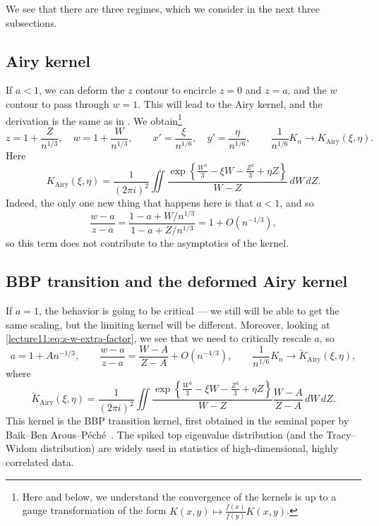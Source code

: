 \documentclass[letterpaper,11pt,oneside,reqno]{book}
\numberwithin{equation}{chapter}  %
\theoremstyle{definition}
\begin{document}
We see that there are three regimes, which we consider in the next three subsections.
\subsection{Airy kernel}
	If $a<1$, we can deform the $z$ contour to encircle $z=0$ and $z=a$,
		and the $w$ contour to pass through $w=1$. This will lead to the Airy kernel,
		and the derivation is the same as in
		.
		We obtain\footnote{Here and below, we understand the convergence
			of the kernels is up to a gauge transformation of the form
		$K(x,y)\mapsto\frac{f(x)}{f(y)}K(x,y)$.}
		\begin{equation*}
			z=1+\frac{Z}{n^{1/3}},\quad w=1+\frac{W}{n^{1/3}},\qquad
			x'=\frac{\xi}{n^{1/6}}, \quad y'=\frac{\eta}{n^{1/6}},
			\qquad
			\frac{1}{n^{1/6}}K_n\to K_{\mathrm{Airy}}(\xi,\eta).
		\end{equation*}
		Here
		\[
			K_{\mathrm{Airy}}(\xi,\eta)=
			\frac{1}{(2\pi i)^2}\iint \frac{\exp\left\{ \frac{W^3}{3}-\xi W-\frac{Z^3}{3}+\eta Z \right\}}{W-Z}\,dW\,dZ.
		\]
		Indeed, the only one new thing that happens here is that $a<1$, and so
		\begin{equation}
			\label{lecture11:eq:z-w-extra-factor}
			\frac{w-a}{z-a}=\frac{1-a+W/n^{1/3}}{1-a+Z/n^{1/3}}=1+O(n^{-1/3}),
		\end{equation}
		so this term does not contribute to the asymptotics of the kernel.

\subsection{BBP transition and the deformed Airy kernel}

		If $a=1$, the behavior is going to be critical --- we still will
		be able to get the same scaling, but the limiting kernel will be different.
		Moreover, looking at \eqref{lecture11:eq:z-w-extra-factor}, we see that
		we need to critically rescale $a$, so
		\begin{equation*}
			a=1+A n^{-1/3},
			\qquad
			\frac{w-a}{z-a}=\frac{W-A}{Z-A}+O(n^{-4/3}),
			\qquad
			\frac{1}{n^{1/6}}K_n\to \tilde K_{\mathrm{Airy}}(\xi,\eta),
		\end{equation*}
		where
		\begin{equation*}
			\tilde K_{\mathrm{Airy}}(\xi,\eta)=
			\frac{1}{(2\pi i)^2}\iint \frac{\exp\left\{
			\frac{W^3}{3}-\xi W-\frac{Z^3}{3}+\eta Z
			\right\}}{W-Z}
			\frac{W-A}{Z-A}
			\,dW\,dZ.
		\end{equation*}
		This kernel is the BBP transition kernel,
		first obtained in the seminal paper by
		Baik--Ben Arous--P\'ech\'e~\cite{BBP2005phase}.
		The spiked top eigenvalue distribution (and the Tracy--Widom distribution)
		are widely used in statistics of high-dimensional,
		highly correlated data.
\end{document}
